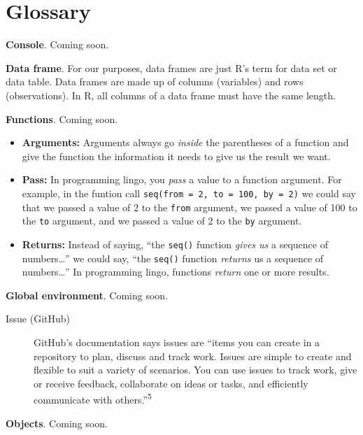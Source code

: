 \documentclass[
  letterpaper,
  DIV=11,
  numbers=noendperiod]{scrreprt}
\begin{document}
\cleardoublepage
{}
{}
\appendix

\chapter{Glossary}\label{sec-glossary}

\textbf{Console}. Coming soon.

\textbf{Data frame}. For our purposes, data frames are just R's term for
data set or data table. Data frames are made up of columns (variables)
and rows (observations). In R, all columns of a data frame must have the
same length.

\textbf{Functions}. Coming soon.

\begin{itemize}
\item
  \textbf{Arguments:} Arguments always go \emph{inside} the parentheses
  of a function and give the function the information it needs to give
  us the result we want.
\item
  \textbf{Pass:} In programming lingo, you \emph{pass} a value to a
  function argument. For example, in the funtion call
  \texttt{seq(from\ =\ 2,\ to\ =\ 100,\ by\ =\ 2)} we could say that we
  passed a value of 2 to the \texttt{from} argument, we passed a value
  of 100 to the \texttt{to} argument, and we passed a value of 2 to the
  \texttt{by} argument.
\item
  \textbf{Returns:} Instead of saying, ``the \texttt{seq()} function
  \emph{gives us} a sequence of numbers\ldots{}'' we could say, ``the
  \texttt{seq()} function \emph{returns} us a sequence of
  numbers\ldots{}'' In programming lingo, functions \emph{return} one or
  more results.
\end{itemize}

\textbf{Global environment}. Coming soon.

\begin{description}
\item[\label{glossary-issue}{Issue (GitHub)}]
GitHub's documentation says issues are ``items you can create in a
repository to plan, discuss and track work. Issues are simple to create
and flexible to suit a variety of scenarios. You can use issues to track
work, give or receive feedback, collaborate on ideas or tasks, and
efficiently communicate with others.''\textsuperscript{5}
\end{description}

\textbf{Objects}. Coming soon.
\end{document}
